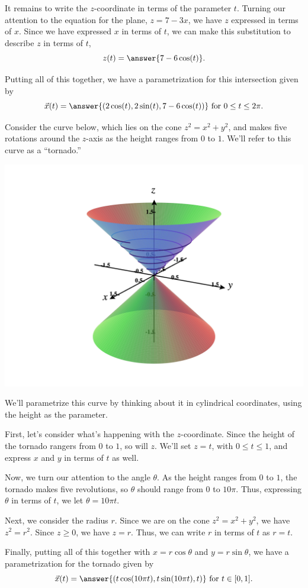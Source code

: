 \documentclass{ximera}
\begin{document}
\begin{example}
It remains to write the $z$-coordinate in terms of the parameter $t$. Turning our attention to the equation for the plane, $z = 7-3x$, we have $z$ expressed in terms of $x$. Since we have expressed $x$ in terms of $t$, we can make this substitution to describe $z$ in terms of $t$,
\[
z(t) = \answer{7-6\cos(t)}.
\]

Putting all of this together, we have a parametrization for this intersection given by
\[
\vec{x}(t) = \answer{(2\cos(t),2\sin(t),7-6\cos(t))} \textrm{ for } 0\leq t\leq 2\pi.
\]

\end{example}

\begin{example}
Consider the curve below, which lies on the cone $z^2 = x^2 + y^2$, and makes five rotations around the $z$-axis as the height ranges from $0$ to $1$. We'll refer to this curve as a ``tornado.''

\begin{image}
\includegraphics[width=\textwidth]{CalcPlot3D-tornado}
\end{image}

We'll parametrize this curve by thinking about it in cylindrical coordinates, using the height as the parameter.

First, let's consider what's happening with the $z$-coordinate. Since the height of the tornado rangers from $0$ to $1$, so will $z$. We'll set $z = t$, with $0\leq t\leq 1$, and express $x$ and $y$ in terms of $t$ as well.

Now, we turn our attention to the angle $\theta$. As the height ranges from $0$ to $1$, the tornado makes five revolutions, so $\theta$ should range from $0$ to $10\pi$. Thus, expressing $\theta$ in terms of $t$, we let $\theta = 10\pi t$.

Next, we consider the radius $r$. Since we are on the cone $z^2 = x^2 + y^2$, we have $z^2 = r^2$. Since $z\geq 0$, we have $z = r$. Thus, we can write $r$ in terms of $t$ as $r = t$.

Finally, putting all of this together with $x = r\cos\theta$ and $y = r\sin\theta$, we have a parametrization for the tornado given by
\[
\vec{x}(t) = \answer{(t\cos(10\pi t), t\sin(10\pi t), t)} \textrm{ for } t\in [0,1].
\]

\end{example}
\end{document}
